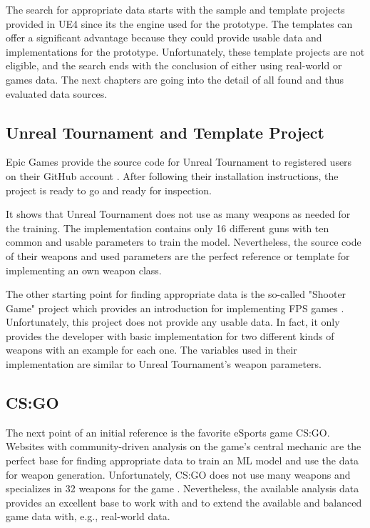 \documentclass[MGS,Master,english]{twbook}%
\begin{document}
The search for appropriate data starts with the sample and template projects provided in \ac{UE4} since its the engine used for the prototype. The templates can offer a significant advantage because they could provide usable data and implementations for the prototype. Unfortunately, these template projects are not eligible, and the search ends with the conclusion of either using real-world or games data. The next chapters are going into the detail of all found and thus evaluated data sources.

\subsection{Unreal Tournament and Template Project}
Epic Games provide the source code for Unreal Tournament to registered users on their GitHub account \cite{epicGames::unrealTournamentSourceCode}. After following their installation instructions, the project is ready to go and ready for inspection.

It shows that Unreal Tournament does not use as many weapons as needed for the training. The implementation contains only 16 different guns with ten common and usable parameters to train the model. Nevertheless, the source code of their weapons and used parameters are the perfect reference or template for implementing an own weapon class.

The other starting point for finding appropriate data is the so-called "Shooter Game" project which provides an introduction for implementing \ac{FPS} games \cite{epicGames::shooterGame}. Unfortunately, this project does not provide any usable data. In fact, it only provides the developer with basic implementation for two different kinds of weapons with an example for each one. The variables used in their implementation are similar to Unreal Tournament’s weapon parameters.

\subsection{\acl{CS:GO}}
The next point of an initial reference is the favorite eSports game \ac{CS:GO}. Websites with community-driven analysis on the game's central mechanic are the perfect base for finding appropriate data to train an \ac{ML} model and use the data for weapon generation. Unfortunately, \ac{CS:GO} does not use many weapons and specializes in 32 weapons for the game \cite{counterstrike::wikiWeapons}. Nevertheless, the available analysis data provides an excellent base to work with and to extend the available and balanced game data with, e.g., real-world data.
\end{document}
